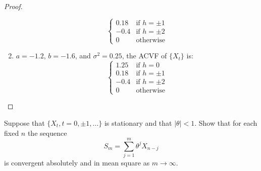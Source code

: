 \documentclass[12pt]{article}
\theoremstyle{definition}
\newenvironment{custompbm}[1]
  {\renewcommand\theproblem{#1}\problem}
  {\endproblem}
\begin{document}
\begin{proof}
\begin{enumerate}
\[\begin{cases}
          0.18 & \text{if $h=\pm1$}\\
          -0.4 & \text{if $h=\pm2$}\\
          0 & \text{otherwise}
        \end{cases}
      \]
    \item $a=-1.2$, $b=-1.6$, and $\sigma^2=0.25$, the ACVF of $\{X_t\}$ is:
      \[
        \begin{cases}
          1.25 & \text{if $h=0$}\\
          0.18 & \text{if $h=\pm1$}\\
          -0.4 & \text{if $h=\pm2$}\\
          0 & \text{otherwise}
        \end{cases}
      \]
  \end{enumerate}
\end{proof}


\begin{custompbm}{2.5}
  Suppose that $\{X_t, t=0, \pm1, \dots\}$ is stationary and that $|\theta|<1$.
  Show that for each fixed $n$ the sequence
  \[
    S_m = \sum_{j=1}^{m} \theta ^ j X_{n-j}
  \]
  is convergent absolutely and in mean square as $m \to \infty$.
\end{custompbm}
\end{document}
